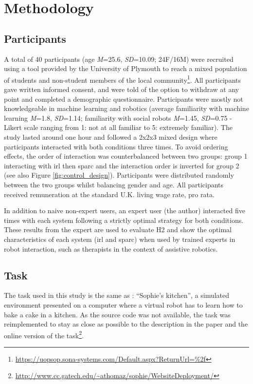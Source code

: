 \section{Methodology}
\subsection{Participants}

A total of 40 participants (age \textit{M}=25.6, \textit{SD}=10.09; 24F/16M) were recruited using a tool provided by the University of Plymouth to reach a mixed population of students and non-student members of the local community\footnote{\url{https://uopsop.sona-systems.com/Default.aspx?ReturnUrl=\%2f}}.  All participants gave written informed consent, and were told of the option to withdraw at any point and completed a demographic questionnaire. Participants were mostly not knowledgeable in machine learning and robotics (average familiarity with machine learning \textit{M}=1.8, \textit{SD}=1.14; familiarity with social robots \textit{M}=1.45, \textit{SD}=0.75 - Likert scale ranging from 1: not at all familiar to 5: extremely familiar). The study lasted around one hour and followed a 2x2x3 mixed design where participants interacted with both conditions three times. To avoid ordering effects, the order of interaction was counterbalanced between two groups: group 1 interacting with \gls{irl} then \gls{sparc} and the interaction order is inverted for group 2 (see also Figure \ref{fig:control_design}). Participants were distributed randomly between the two groups whilst balancing gender and age. All participants received remuneration at the standard U.K. living wage rate, pro rata. 

In addition to naive non-expert users, an expert user (the author) interacted five times with each system following a strictly optimal strategy for both conditions. These results from the expert are used to evaluate H2 and show the optimal characteristics of each system (\gls{irl} and \gls{sparc}) when used by trained experts in robot interaction, such as therapists in the context of assistive robotics.


\subsection{Task} \label{ssec:control_task}

The task used in this study is the same as \cite{thomaz2008teachable}: ``Sophie's kitchen'', a simulated environment presented on a computer where a virtual robot has to learn how to bake a cake in a kitchen. As the source code was not available, the task was reimplemented to stay as close as possible to the description in the paper and the online version of the task\footnote{\url{http://www.cc.gatech.edu/~athomaz/sophie/WebsiteDeployment/}}.

